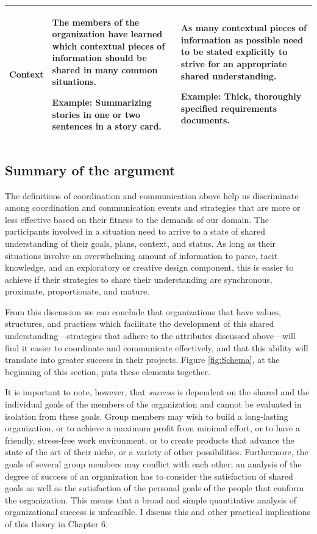 \begin{table}[tbp]
{\begin{tabular}{p{2.0cm}p{5.8cm}p{5.8cm}}
\hline
\vspace{0.5pt} Context & \vspace{0.5pt} The members of the organization have learned which contextual pieces of information should be shared in many common situations. \par Example: Summarizing stories in one or two sentences in a story card. & \vspace{0.5pt} As many contextual pieces of information as possible need to be stated explicitly to strive for an appropriate shared understanding. \par Example: Thick, thoroughly specified requirements documents.\\
\hline
\end{tabular}}
\end{table}


\subsection{Summary of the argument}

The definitions of coordination and communication above help us discriminate among coordination and communication events and strategies that are more or less effective based on their fitness to the demands of our domain. The participants involved in a situation need to arrive to a state of shared understanding of their goals, plans, context, and status. As long as their situations involve an overwhelming amount of information to parse, tacit knowledge, and an exploratory or creative design component, this is easier to achieve if their strategies to share their understanding are synchronous, proximate, proportionate, and mature.

From this discussion we can conclude that organizations that have values, structures, and practices which facilitate the development of this shared understanding---strategies that adhere to the attributes discussed above---will find it easier to coordinate and communicate effectively, and that this ability will translate into greater success in their projects. Figure \ref{fig:Schema}, at the beginning of this section, puts these elements together.

It is important to note, however, that \emph{success} is dependent on the shared and the individual goals of the members of the organization and cannot be evaluated in isolation from these goals. Group members may wish to build a long-lasting organization, or to achieve a maximum profit from minimal effort, or to have a friendly, stress-free work environment, or to create products that advance the state of the art of their niche, or a variety of other possibilities. Furthermore, the goals of several group members may conflict with each other; an analysis of the degree of success of an organization has to consider the satisfaction of shared goals as well as the satisfaction of the personal goals of the people that conform the organization. This means that a broad and simple quantitative analysis of organizational success is unfeasible. I discuss this and other practical implications of this theory in Chapter 6.

